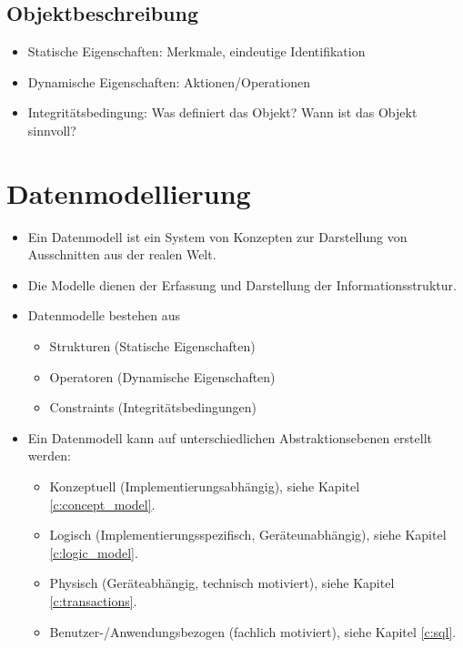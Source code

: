 \documentclass[a4paper, 11pt, accentcolor = tud3b]{tudreport}
\begin{document}
            \subsection{Objektbeschreibung} %
                \begin{itemize}
                	\item Statische Eigenschaften: Merkmale, eindeutige Identifikation
                	\item Dynamische Eigenschaften: Aktionen/Operationen
                	\item Integritätsbedingung: Was definiert das Objekt? Wann ist das Objekt sinnvoll?
                \end{itemize}

        \section{Datenmodellierung} %
            \begin{itemize}
            	\item Ein Datenmodell ist ein System von Konzepten zur Darstellung von Ausschnitten aus der realen Welt.
            	\item Die Modelle dienen der Erfassung und Darstellung der Informationsstruktur.
            	\item Datenmodelle bestehen aus
            		\begin{itemize}
            			\item Strukturen (Statische Eigenschaften)
            			\item Operatoren (Dynamische Eigenschaften)
            			\item Constraints (Integritätsbedingungen)
            		\end{itemize}
            	\item Ein Datenmodell kann auf unterschiedlichen Abstraktionsebenen erstellt werden:
            		\begin{itemize}
            			\item Konzeptuell (Implementierungsabhängig), siehe Kapitel \ref{c:concept_model}.
            			\item Logisch (Implementierungsspezifisch, Geräteunabhängig), siehe Kapitel \ref{c:logic_model}.
            			\item Physisch (Geräteabhängig, technisch motiviert), siehe Kapitel \ref{c:transactions}.
            			\item Benutzer-/Anwendungsbezogen (fachlich motiviert), siehe Kapitel \ref{c:sql}.
            		\end{itemize}
            \end{itemize}
\end{document}
